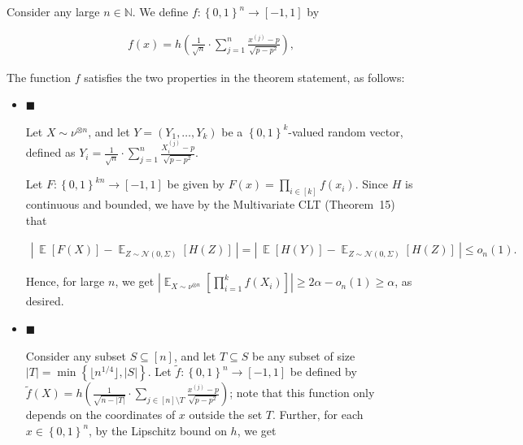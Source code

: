Consider any large $n\in\mathbb{N}$.
We define $f:\left\{0,1\right\}^{n}\to[-1,1]$ by\par


\[\begin{gathered}
f(x)=h\left(\frac{1}{\sqrt{n}}\cdot\sum_{j=1}^{n}\frac{x^{\left(j\right)}-p}{\sqrt{p-p^{2}}}\right),
\end{gathered}\]


The function $f$ satisfies the two properties in the theorem statement, as follows:\par




\begin{itemize}


\item[] 
$\blacksquare$ 


Let $X\sim\nu^{\otimes n}$, and let $Y=(Y_{1},\dots,Y_{k})$ be a $\left\{0,1\right\}^{k}$-valued random vector, defined as $Y_{i}=\frac{1}{\sqrt{n}}\cdot\sum_{j=1}^{n}\frac{X_{i}^{\left(j\right)}-p}{\sqrt{p-p^{2}}}$.\par




Let $F:\left\{0,1\right\}^{kn}\to[-1,1]$ be given by $F(x)=\prod_{i\in[k]}f\left(x_{i}\right)$.
Since $H$ is continuous and bounded, we have by the Multivariate CLT (Theorem 15) that\par


\[\begin{gathered}
\left|\ \mathop{\mathbb{E}}\left[F(X)\right]-\mathop{\mathbb{E}}_{Z\sim\mathcal{N}(0,\Sigma)}\left[H(Z)\right]\ \right|=\left|\ \mathop{\mathbb{E}}\left[{H(Y)}\right]-\mathop{\mathbb{E}}_{Z\sim\mathcal{N}(0,\Sigma)}\left[H(Z)\right]\ \right|\leqslant o_{n}(1).
\end{gathered}\]


Hence, for large $n$, we get $\left|\mathop{\mathbb{E}}_{X\sim\nu^{\otimes n}}\left[\prod_{i=1}^{k}f(X_{i})\right]\right|\geqslant 2\alpha-o_{n}(1)\geqslant\alpha$, as desired.\par





\item[] 
$\blacksquare$ 


Consider any subset $S\subseteq[n]$, and let $T\subseteq S$ be any subset of size $\left|T\right|=\min\left\{\lfloor n^{1/4}\rfloor,\left|S\right|\right\}$. Let $\tilde{f}:\left\{0,1\right\}^{n}\to[-1,1]$ be defined by $\tilde{f}(X)=h\left(\frac{1}{\sqrt{n-\left|T\right|}}\cdot\sum_{j\in[n]\setminus T}\frac{x^{\left(j\right)}-p}{\sqrt{p-p^{2}}}\right)$; note that this function only depends on the coordinates of $x$ outside the set $T$. Further, for each $x\in\left\{0,1\right\}^{n}$, by the Lipschitz bound on $h$, we get\par





\end{itemize}
